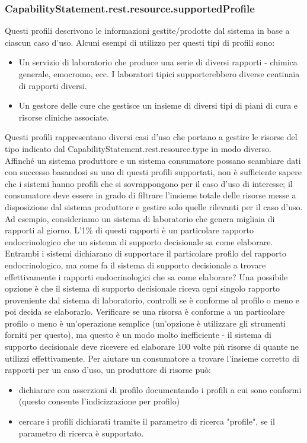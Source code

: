 \documentclass{article}
\begin{document}
\subsubsection*{CapabilityStatement.rest.resource.supportedProfile}
Questi profili descrivono le informazioni gestite/prodotte dal sistema in base a ciascun caso d'uso. Alcuni esempi di utilizzo per questi tipi di profili sono:
\begin{itemize}
    \item Un servizio di laboratorio che produce una serie di diversi rapporti - chimica generale, emocromo, ecc. I laboratori tipici supporterebbero diverse centinaia di rapporti diversi.
    \item Un gestore delle cure che gestisce un insieme di diversi tipi di piani di cura e risorse cliniche associate.
\end{itemize}
Questi profili rappresentano diversi casi d'uso che portano a gestire le risorse del tipo indicato dal CapabilityStatement.rest.resource.type in modo diverso.
Affinché un sistema produttore e un sistema consumatore possano scambiare dati con successo basandosi su uno di questi profili supportati, non è sufficiente sapere che i sistemi hanno profili
che si sovrappongono per il caso d'uso di interesse; il consumatore deve essere in grado di filtrare l'insieme totale delle risorse messe a disposizione dal sistema produttore e gestire solo
quelle rilevanti per il caso d'uso.
Ad esempio, consideriamo un sistema di laboratorio che genera migliaia di rapporti al giorno. L'1\%  di questi rapporti è un particolare rapporto endocrinologico
che un sistema di supporto decisionale sa come elaborare. Entrambi i sistemi dichiarano di supportare il particolare profilo del rapporto endocrinologico, ma come
fa il sistema di supporto decisionale a trovare effettivamente i rapporti endocrinologici che sa come elaborare?
Una possibile opzione è che il sistema di supporto decisionale riceva ogni singolo rapporto proveniente dal sistema di laboratorio, controlli se è conforme al profilo o meno
e poi decida se elaborarlo. Verificare se una risorsa è conforme a un particolare profilo o meno è un'operazione semplice (un'opzione è utilizzare gli strumenti forniti per questo),
ma questo è un modo molto inefficiente - il sistema di supporto decisionale deve ricevere ed elaborare 100 volte più risorse di quante ne utilizzi effettivamente.
Per aiutare un consumatore a trovare l'insieme corretto di rapporti per un caso d'uso, un produttore di risorse può:
\begin{itemize}
    \item dichiarare con asserzioni di profilo documentando i profili a cui sono conformi (questo consente l'indicizzazione per profilo)
    \item cercare i profili dichiarati tramite il parametro di ricerca "profile", se il parametro di ricerca è supportato.
\end{itemize}
\end{document}
